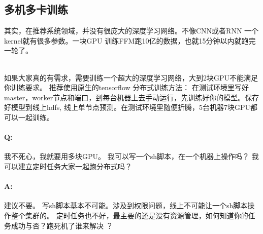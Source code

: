 \documentclass[12pt,a4paper,oneside]{article}
\begin{document}
\begin{CJK*}{UTF8}{gbsn}
\subsection{多机多卡训练}
其实，在推荐系统领域，并没有很庞大的深度学习网络。不像CNN或者RNN 一个kernel就有很多参数。一块GPU 训练FFM跑10亿的数据，也就15分钟以内就跑完一轮了。

~\\
如果大家真的有需求，需要训练一个超大的深度学习网络，大到2块GPU不能满足你训练要求。 推荐使用原生的tensorflow 分布式训练方法： 在测试环境里写好master，worker节点和端口，到每台机器上去手动运行，先训练好你的模型。保存好模型到线上hdfs, 线上单节点预测。在测试环境里随便折腾，5台机器7块GPU都可以一起训练。

\paragraph{Q: } 我不死心，我就要用多块GPU。 我可以写一个sh脚本，在一个机器上操作吗？ 我可以建立定时任务大家一起跑分布式吗？
\paragraph{A: } 建议不要。 写sh脚本基本不可能。涉及到权限问题，线上不可能让一个sh脚本操作整个集群的。 定时任务也不好，最主要的还是没有资源管理，如何知道你的任务成功与否？跑死机了谁来解决 ？
\end{CJK*}
\end{document}
